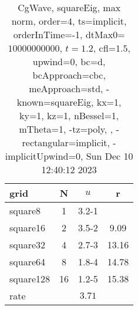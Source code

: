 \begin{table}[H]\tableFont %
\begin{center}
\begin{tabular}{|l|c|c|c|} \hline 
grid  & N &  $ u $ & r \\ \hline 
   square8 &     1 & \num{3.2}{-1} &        \\ \hline
  square16 &     2 & \num{3.5}{-2} &  9.09  \\ \hline
  square32 &     4 & \num{2.7}{-3} & 13.16  \\ \hline
  square64 &     8 & \num{1.8}{-4} & 14.78  \\ \hline
 square128 &    16 & \num{1.2}{-5} & 15.38  \\ \hline
    rate             &       &  $3.71$       &       \\ \hline
\end{tabular}
\caption{CgWave, squareEig, max norm, order=$4$, ts=implicit, orderInTime=-1, dtMax0=$10000000000$, $t=1.2$, cfl=$1.5$, upwind=0, bc=d, bcApproach=cbc, meApproach=std, -known=squareEig, kx=1, ky=1, kz=1, nBessel=1, mTheta=1, -tz=poly, , -rectangular=implicit, -implicitUpwind=0, Sun Dec 10 12:40:12 2023}\label{table:squareEigOrder4max}
\end{center}
\end{table}
